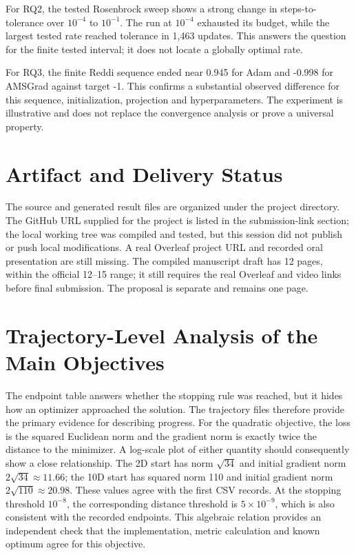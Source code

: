 \documentclass[conference]{IEEEtran}
\begin{document}
For RQ2, the tested Rosenbrock sweep shows a strong change in steps-to-tolerance over $10^{-4}$ to $10^{-1}$. The run at $10^{-4}$ exhausted its budget, while the largest tested rate reached tolerance in 1,463 updates. This answers the question for the finite tested interval; it does not locate a globally optimal rate.

For RQ3, the finite Reddi sequence ended near 0.945 for Adam and -0.998 for AMSGrad against target -1. This confirms a substantial observed difference for this sequence, initialization, projection and hyperparameters. The experiment is illustrative and does not replace the convergence analysis or prove a universal property.
\section{Artifact and Delivery Status}
The source and generated result files are organized under the project directory. The GitHub URL supplied for the project is listed in the submission-link section; the local working tree was compiled and tested, but this session did not publish or push local modifications. A real Overleaf project URL and recorded oral presentation are still missing. The compiled manuscript draft has 12 pages, within the official 12--15 range; it still requires the real Overleaf and video links before final submission. The proposal is separate and remains one page.

\section{Trajectory-Level Analysis of the Main Objectives}
The endpoint table answers whether the stopping rule was reached, but it hides how an optimizer approached the solution. The trajectory files therefore provide the primary evidence for describing progress. For the quadratic objective, the loss is the squared Euclidean norm and the gradient norm is exactly twice the distance to the minimizer. A log-scale plot of either quantity should consequently show a close relationship. The 2D start has norm $\sqrt{34}$ and initial gradient norm $2\sqrt{34}\approx11.66$; the 10D start has squared norm 110 and initial gradient norm $2\sqrt{110}\approx20.98$. These values agree with the first CSV records. At the stopping threshold $10^{-8}$, the corresponding distance threshold is $5\times10^{-9}$, which is also consistent with the recorded endpoints. This algebraic relation provides an independent check that the implementation, metric calculation and known optimum agree for this objective.
\end{document}
